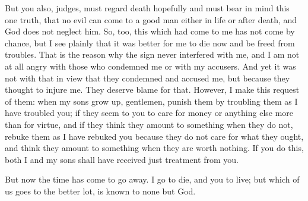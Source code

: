 \documentclass[letterpaper,12pt]{article}
\newcommand{\stephpag}[1]{\marginnote{\small\itshape\fontfamily{ppl}\selectfont #1}}
\begin{document}
But you also, judges, must regard death hopefully and must bear in mind this one truth, \stephpag{d} that no evil can come to a good man either in life or after death, and God does not neglect him. So, too, this which had come to me has not come by chance, but I see plainly that it was better for me to die now and be freed from troubles. That is the reason why the sign never interfered with me, and I am not at all angry with those who condemned me or with my accusers. And yet it was not with that in view that they condemned and accused me, but because \stephpag{e} they thought to injure me. They deserve blame for that. However, I make this request of them: when my sons grow up, gentlemen, punish them by troubling them as I have troubled you; if they seem to you to care for money or anything else more than for virtue, and if they think they amount to something when they do not, rebuke them as I have rebuked you because they do not care for what they ought, and think they amount to something when they are worth nothing. If you do this, both I and my sons \stephpag{42 a} shall have received just treatment from you.

But now the time has come to go away. I go to die, and you to live; but which of us goes to the better lot, is known to none but God.
\end{document}
